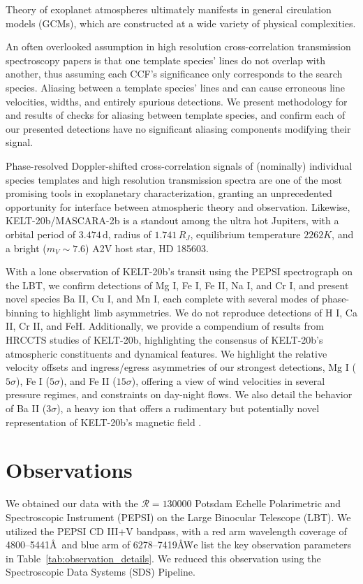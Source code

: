 \documentclass[twocolumn]{aastex631}
\begin{document}
        Theory of exoplanet atmospheres ultimately manifests in general circulation models (GCMs), which are constructed at a wide variety of physical complexities. 
        
        An often overlooked assumption in high resolution cross-correlation transmission spectroscopy papers is that one template species' lines do not overlap with another, thus assuming each CCF's significance only corresponds to the search species. Aliasing between a template species' lines and can cause erroneous line velocities, widths, and entirely spurious detections. We present methodology for and results of checks for aliasing between template species, and confirm each of our presented detections have no significant aliasing components modifying their signal.

        Phase-resolved Doppler-shifted cross-correlation signals of (nominally) individual species templates and high resolution transmission spectra are one of the most promising tools in exoplanetary characterization, granting an unprecedented opportunity for interface between atmospheric theory and observation. Likewise, KELT-20b/MASCARA-2b is a standout among the ultra hot Jupiters, with a orbital period of $3.474\,\text{d}$, radius of $1.741\,R_{J}$, equilibrium temperature $2262K$, and a bright ($m_V\sim7.6$) A2V host star, HD 185603.
        
        With a lone observation of KELT-20b's transit using the PEPSI spectrograph on the LBT, we confirm detections of Mg I, Fe I, Fe II, Na I, and Cr I, and present novel species Ba II, Cu I, and Mn I, each complete with several modes of phase-binning to highlight limb asymmetries. We do not reproduce detections of H I, Ca II, Cr II, and FeH. Additionally, we provide a compendium of results from HRCCTS studies of KELT-20b, highlighting the consensus of KELT-20b's atmospheric constituents and dynamical features. We highlight the relative velocity offsets and ingress/egress asymmetries of our strongest detections, Mg I ($5\sigma$), Fe I ($5\sigma$), and Fe II ($15\sigma$), offering a view of wind velocities in several pressure regimes, and constraints on day-night flows. We also detail the behavior of Ba II ($3\sigma$), a heavy ion that offers a rudimentary but potentially novel representation of KELT-20b's magnetic field \citep{Savel2024}.
        

    

    \section{Observations}\label{sec:Observations}
        We obtained our data with the ${\mathcal{R} = 130000}$ Potsdam Echelle Polarimetric and Spectroscopic Instrument (PEPSI)\citep{Strassmeier2015} on the Large Binocular Telescope (LBT). We utilized the PEPSI CD III+V bandpass, with a red arm wavelength coverage of 4800--5441\AA\ and blue arm of 6278--7419\AA\. We list the key observation parameters in Table~\ref{tab:observation_details}. We reduced this observation using the Spectroscopic Data Systems (SDS) Pipeline. 
\end{document}
